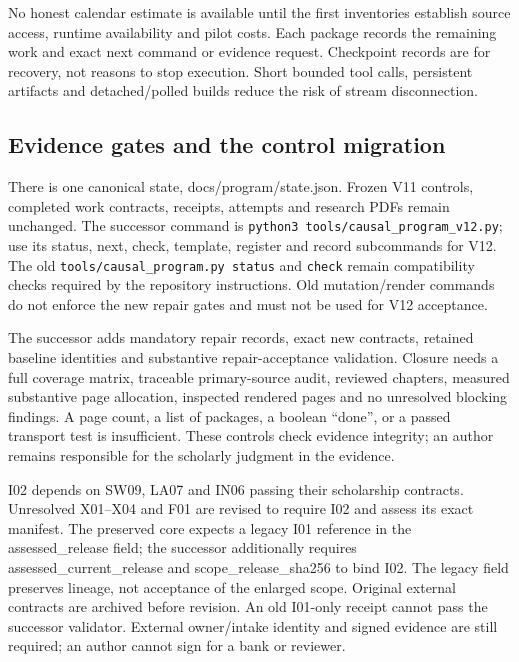\documentclass[
  11pt,
  a4paper,
]{article}
\begin{document}
No honest calendar estimate is available until the first inventories
establish source access, runtime availability and pilot costs. Each
package records the remaining work and exact next command or evidence
request. Checkpoint records are for recovery, not reasons to stop
execution. Short bounded tool calls, persistent artifacts and
detached/polled builds reduce the risk of stream disconnection.

\hypertarget{evidence-gates-and-the-control-migration}{%
\subsection{Evidence gates and the control
migration}\label{evidence-gates-and-the-control-migration}}

There is one canonical state, docs/program/state.json. Frozen V11
controls, completed work contracts, receipts, attempts and research PDFs
remain unchanged. The successor command is
\texttt{python3\ tools/causal\_program\_v12.py}; use its status, next,
check, template, register and record subcommands for V12. The old
\texttt{tools/causal\_program.py\ status} and \texttt{check} remain
compatibility checks required by the repository instructions. Old
mutation/render commands do not enforce the new repair gates and must
not be used for V12 acceptance.

The successor adds mandatory repair records, exact new contracts,
retained baseline identities and substantive repair-acceptance
validation. Closure needs a full coverage matrix, traceable
primary-source audit, reviewed chapters, measured substantive page
allocation, inspected rendered pages and no unresolved blocking
findings. A page count, a list of packages, a boolean ``done'', or a
passed transport test is insufficient. These controls check evidence
integrity; an author remains responsible for the scholarly judgment in
the evidence.

I02 depends on SW09, LA07 and IN06 passing their scholarship contracts.
Unresolved X01--X04 and F01 are revised to require I02 and assess its
exact manifest. The preserved core expects a legacy I01 reference in the
assessed\_release field; the successor additionally requires
assessed\_current\_release and scope\_release\_sha256 to bind I02. The
legacy field preserves lineage, not acceptance of the enlarged scope.
Original external contracts are archived before revision. An old
I01-only receipt cannot pass the successor validator. External
owner/intake identity and signed evidence are still required; an author
cannot sign for a bank or reviewer.
\end{document}

